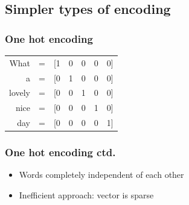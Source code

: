 \subsection{Simpler types of encoding}


\begin{frame}
	\frametitle{One hot encoding}
	
\begin{table}[h]
	\hspace{15mm}
	\huge
	\begin{tabular}{rcccccc}
		What & = & [1 & 0 & 0 & 0 & 0] \\
		a & = & [0 &  1 &  0 &  0 & 0] \\
		lovely & = & [0 & 0& 1& 0& 0] \\
		nice & = & [0 &0& 0& 1& 0] \\
		day & = & [0 &0& 0& 0& 1] \\
	\end{tabular}
\end{table}


\end{frame}



\begin{frame}
\frametitle{One hot encoding ctd.}

	\begin{itemize}
		\item Words completely independent of each other
		\item Inefficient approach: vector is sparse
	\end{itemize}

\end{frame}


